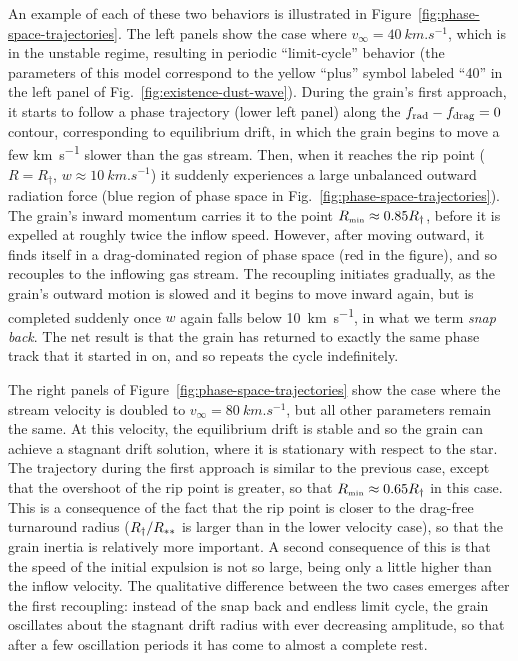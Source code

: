 An example of each of these two behaviors is illustrated in
Figure~\ref{fig:phase-space-trajectories}.  The left panels show the
case where \(v_\infty = \SI{40}{km.s^{-1}}\), which is in the unstable
regime, resulting in periodic ``limit-cycle'' behavior (the parameters
of this model correspond to the yellow ``plus'' symbol labeled ``40''
in the left panel of Fig.~\ref{fig:existence-dust-wave}).  During the
grain's first approach, it starts to follow a phase trajectory (lower
left panel) along the \(f_{\text{rad}} - f_{\text{drag}} = 0\) contour, corresponding to
equilibrium drift, in which the grain begins to move a few
\si{km.s^{-1}} slower than the gas stream.  Then, when it reaches the
rip point (\(R = R_\dag\), \(w \approx \SI{10}{km.s^{-1}}\)) it suddenly
experiences a large unbalanced outward radiation force (blue region of
phase space in Fig.~\ref{fig:phase-space-trajectories}). The grain's
inward momentum carries it to the point \(R_{\scriptscriptstyle\text{min}} \approx 0.85 R_\dag\), before
it is expelled at roughly twice the inflow speed.  However, after
moving outward, it finds itself in a drag-dominated region of phase
space (red in the figure), and so recouples to the inflowing gas
stream.  The recoupling initiates gradually, as the grain's outward
motion is slowed and it begins to move inward again, but is completed
suddenly once \(w\) again falls below \SI{10}{km.s^{-1}}, in what we
term \textit{snap back}. The net result is that the grain has returned
to exactly the same phase track that it started in on, and so repeats
the cycle indefinitely.

The right panels of Figure~\ref{fig:phase-space-trajectories} show the
case where the stream velocity is doubled to
\(v_\infty = \SI{80}{km.s^{-1}}\), but all other parameters remain the
same.  At this velocity, the equilibrium drift is stable and so the
grain can achieve a stagnant drift solution, where it is stationary
with respect to the star.  The trajectory during the first approach is
similar to the previous case, except that the overshoot of the rip
point is greater, so that \(R_{\scriptscriptstyle\text{min}} \approx 0.65 R_\dag\) in this case.  This is
a consequence of the fact that the rip point is closer to the
drag-free turnaround radius (\(R_\dag / R_{**}\) is larger than in
the lower velocity case), so that the grain inertia is relatively more
important.  A second consequence of this is that the speed of the
initial expulsion is not so large, being only a little higher than the
inflow velocity.  The qualitative difference between the two cases
emerges after the first recoupling: instead of the snap back and
endless limit cycle, the grain oscillates about the stagnant drift
radius with ever decreasing amplitude, so that after a few oscillation
periods it has come to almost a complete rest.

